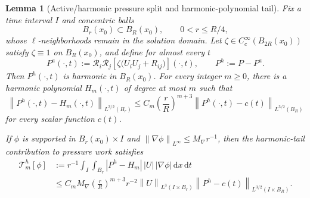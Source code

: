 \documentclass[11pt]{article}
\numberwithin{equation}{section}
\newtheorem{lemma}[theorem]{Lemma}
\newcommand{\dxdt}{\,\mathrm dx\,\mathrm dt}
\newcommand{\norm}[2]{\left\lVert #1\right\rVert_{#2}}
\begin{document}
\begin{lemma}[Active/harmonic pressure split and harmonic-polynomial tail]\label{lem:harmonic-tail}
Fix a time interval \(I\) and concentric balls
\[
B_r(x_0)\subset B_R(x_0),
\qquad
0<r\le R/4,
\]
whose \(\ell\)-neighborhoods remain in the solution domain. Let \(\zeta\in C_c^\infty(B_{2R}(x_0))\) satisfy \(\zeta\equiv1\) on \(B_R(x_0)\), and define for almost every \(t\)
\begin{equation}\label{eq:active-pressure}
P^a(\cdot,t)
:=
\mathcal R_i\mathcal R_j
\left[
\zeta\bigl(U_iU_j+R_{ij}\bigr)
\right](\cdot,t),
\qquad
P^h:=P-P^a.
\end{equation}
Then \(P^h(\cdot,t)\) is harmonic in \(B_R(x_0)\). For every integer \(m\ge0\), there is a harmonic polynomial \(H_m(\cdot,t)\) of degree at most \(m\) such that
\begin{equation}\label{eq:harmonic-tail}
\norm{P^h(\cdot,t)-H_m(\cdot,t)}{L^{3/2}(B_r)}
\le
C_m
\left(\frac rR\right)^{m+3}
\norm{P^h(\cdot,t)-c(t)}{L^{3/2}(B_R)}
\end{equation}
for every scalar function \(c(t)\).

If \(\phi\) is supported in \(B_r(x_0)\times I\) and \(\norm{\nabla\phi}{L^\infty}\le M_\nabla r^{-1}\), then the harmonic-tail contribution to pressure work satisfies
\begin{align}
\mathcal T_{m}^{h}[\phi]
&:=
 r^{-1}
\int_I\int_{B_r}
|P^h-H_m|\,|U|\,|\nabla\phi|\dxdt
\label{eq:T-h-def}
\\
&\le
C_mM_\nabla
\left(\frac rR\right)^{m+3}
 r^{-2}
\norm{U}{L^3(I\times B_r)}
\norm{P^h-c(t)}{L^{3/2}(I\times B_R)}.
\label{eq:T-h-bound}
\end{align}
\end{lemma}
\end{document}
